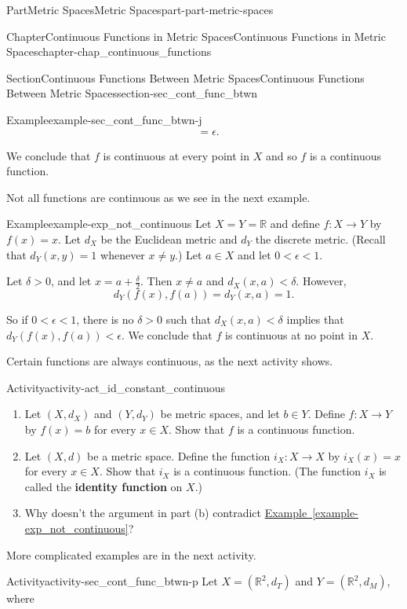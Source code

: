 \documentclass[oneside,10pt,]{book}
\newcommand{\xreffont}{\relax}
\newcommand{\terminology}[1]{\textbf{#1}}
\numberwithin{equation}{chapter}
\newcommand{\R}{\mathbb{R}}
\newcommand{\lt}{<}
\newcommand{\gt}{>}
\newcommand{\amp}{&}
\begin{document}
\begin{partptx}{Part}{Metric Spaces}{}{Metric Spaces}{}{}{part-part-metric-spaces}
\begin{chapterptx}{Chapter}{Continuous Functions in Metric Spaces}{}{Continuous Functions in Metric Spaces}{}{}{chapter-chap_continuous_functions}
\begin{sectionptx}{Section}{Continuous Functions Between Metric Spaces}{}{Continuous Functions Between Metric Spaces}{}{}{section-sec_cont_func_btwn}
\begin{example}{Example}{}{example-sec_cont_func_btwn-j}
\begin{align*}
\amp = \epsilon\text{.}
\end{align*}
%
\par
We conclude that \(f\) is continuous at every point in \(X\) and so \(f\) is a continuous function.%
\end{example}
Not all functions are continuous as we see in the next example.%
\begin{example}{Example}{}{example-exp_not_continuous}%
Let \(X = Y = \R\) and define \(f : X \to Y\) by \(f(x) = x\). Let \(d_X\) be the Euclidean metric and \(d_Y\) the discrete metric. (Recall that \(d_Y(x,y) = 1\) whenever \(x \neq y\).) Let \(a \in X\) and let \(0 \lt \epsilon \lt 1\).%
\par
Let \(\delta \gt 0\), and let \(x = a+\frac{\delta}{2}\). Then \(x \neq a\) and \(d_X(x,a) \lt  \delta\). However,%
\begin{equation*}
d_Y(f(x),f(a)) = d_Y(x,a) = 1\text{.}
\end{equation*}
%
\par
So if \(0 \lt \epsilon \lt 1\), there is no \(\delta \gt 0\) such that \(d_X(x,a) \lt \delta\) implies that \(d_Y(f(x),f(a)) \lt \epsilon\). We conclude that \(f\) is continuous at no point in \(X\).%
\end{example}
Certain functions are always continuous, as the next activity shows.%
\begin{activity}{Activity}{}{activity-act_id_constant_continuous}%
\begin{enumerate}[font=\bfseries,label=(\alph*),ref=\alph*]%
\item{}Let \((X, d_X)\) and \((Y, d_Y)\) be metric spaces, and let \(b \in Y\). Define \(f : X \to Y\) by \(f(x) = b\) for every \(x \in X\). Show that \(f\) is a continuous function.%
\item{}Let \((X, d)\) be a metric space. Define the function \(i_X : X \to X\) by \(i_X(x) = x\) for every \(x \in X\). Show that \(i_X\) is a continuous function. (The function \(i_X\) is called the \terminology{identity function}  on \(X\).)%
\item{}Why doesn't the argument in part (b) contradict \hyperref[example-exp_not_continuous]{Example~{\xreffont\ref{example-exp_not_continuous}}}?%
\end{enumerate}%
\end{activity}%
More complicated examples are in the next activity.%
\begin{activity}{Activity}{}{activity-sec_cont_func_btwn-p}%
Let \(X = (\R^2, d_T)\) and \(Y = (\R^2, d_M)\), where%

\end{activity}
\end{sectionptx}
\end{chapterptx}
\end{partptx}
\end{document}
